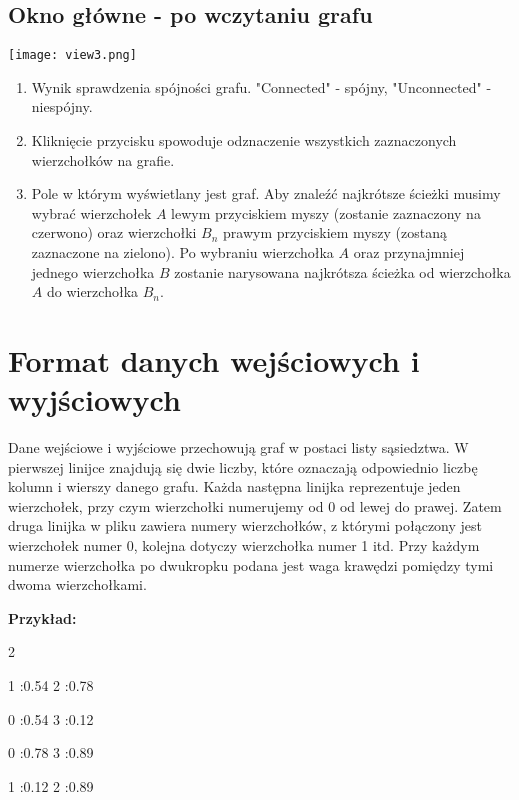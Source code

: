 \documentclass[11pt,a4paper]{report}
\newenvironment{multiconsole}{\begingroup\fontfamily{qcr}\selectfont}{\endgroup}
\begin{document}
    \subsection{Okno główne - po wczytaniu grafu}

    \texttt{[image: view3.png]}

    \begin{enumerate}
        \item Wynik sprawdzenia spójności grafu. "Connected" - spójny, "Unconnected" - niespójny.
        \item Kliknięcie przycisku spowoduje odznaczenie wszystkich zaznaczonych wierzchołków na grafie.
        \item Pole w którym wyświetlany jest graf. Aby znaleźć najkrótsze ścieżki musimy wybrać wierzchołek $A$ lewym przyciskiem myszy (zostanie zaznaczony na czerwono) oraz wierzchołki $B_n$ prawym przyciskiem myszy (zostaną zaznaczone na zielono). Po wybraniu wierzchołka $A$ oraz przynajmniej jednego wierzchołka $B$ zostanie narysowana najkrótsza ścieżka od wierzchołka $A$ do wierzchołka $B_n$.
    \end{enumerate}




    \newpage
    \section{Format danych wejściowych i wyjściowych}
    Dane wejściowe i wyjściowe przechowują graf w postaci listy sąsiedztwa. W pierwszej linijce znajdują się dwie liczby, które oznaczają odpowiednio liczbę kolumn i wierszy danego grafu. Każda następna linijka reprezentuje jeden wierzchołek, przy czym wierzchołki numerujemy od 0 od lewej do prawej. Zatem druga linijka w pliku zawiera numery wierzchołków, z którymi połączony jest wierzchołek numer 0, kolejna dotyczy wierzchołka numer 1 itd. Przy każdym numerze wierzchołka po dwukropku podana jest waga krawędzi pomiędzy tymi dwoma wierzchołkami.

    \vspace{1em}

    \noindent
    \textbf{Przykład:}

    \begin{multiconsole}
        2 2

        \hspace*{2em}1 :0.54  2 :0.78

        \hspace*{2em}0 :0.54  3 :0.12

        \hspace*{2em}0 :0.78  3 :0.89

        \hspace*{2em}1 :0.12  2 :0.89
    \end{multiconsole}
\end{document}
